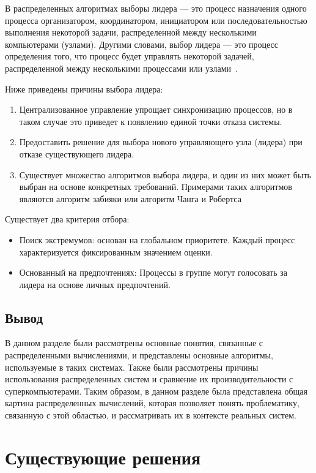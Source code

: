 В распределенных алгоритмах выборы лидера --- это процесс назначения одного процесса организатором, координатором, инициатором или последовательностью выполнения некоторой задачи, распределенной между несколькими компьютерами (узлами).
Другими словами, выбор лидера --- это процесс определения того, что процесс будет управлять некоторой задачей, распределенной между несколькими процессами или узлами~\cite{leader-krchowdharry}.

Ниже приведены причины выбора лидера:
\begin{enumerate}
  \item Централизованное управление упрощает синхронизацию процессов, но в таком случае это приведет к появлению единой точки отказа системы.
  \item Предоставить решение для выбора нового управляющего узла (лидера) при отказе существующего лидера.
  \item Существует множество алгоритмов выбора лидера, и один из них может быть выбран на основе конкретных требований. Примерами таких алгоритмов являются алгоритм забияки или алгоритм Чанга и Робертса
\end{enumerate}

Существует два критерия отбора:
\begin{itemize}
  \item Поиск экстремумов: основан на глобальном приоритете. Каждый процесс характеризуется фиксированным значением оценки.
  \item Основанный на предпочтениях: Процессы в группе могут голосовать за лидера на основе личных предпочтений.
\end{itemize}

\clearpage %

\subsection*{Вывод}

В данном разделе были рассмотрены основные понятия, связанные с распределенными вычислениями, и представлены основные алгоритмы, используемые в таких системах.
Также были рассмотрены причины использования распределенных систем и сравнение их производительности с суперкомпьютерами.
Таким образом, в данном разделе была представлена общая картина распределенных вычислений, которая позволяет понять проблематику, связанную с этой областью, и рассматривать их в контексте реальных систем.

\section{Существующие решения}
